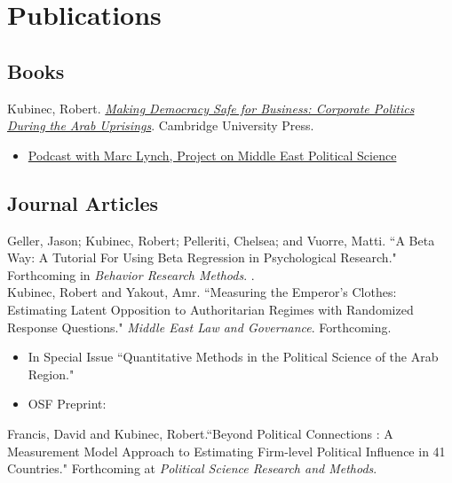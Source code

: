 \documentclass[11pt, a4paper]{article}
\newcommand{\years}[1]{\marginnote{\scriptsize #1}}
\begin{document}
\section*{Publications}

\subsection*{Books}

\years{2023} Kubinec, Robert. \emph{\href{https://www.cambridge.org/gb/academic/subjects/politics-international-relations/political-economy/making-democracy-safe-business-corporate-politics-during-arab-uprisings?format=HB}{Making Democracy Safe for Business: Corporate Politics During the Arab Uprisings}}. Cambridge University Press.\\

\begin{itemize}
	\item \href{https://pomeps.org/making-democracy-safe-for-business-apsa-virtual-posters-s-13-ep-1}{Podcast with Marc Lynch, Project on Middle East Political Science}
\end{itemize}
 
\subsection*{Journal Articles}

\years{2026} Geller, Jason; Kubinec, Robert; Pelleriti, Chelsea; and Vuorre, Matti. ``A Beta Way: A Tutorial For Using Beta Regression in Psychological Research." Forthcoming in \emph{Behavior Research Methods}. .\\

\years{2026} Kubinec, Robert and Yakout, Amr. ``Measuring the Emperor's Clothes: Estimating Latent Opposition to Authoritarian Regimes with Randomized Response Questions." \emph{Middle East Law and Governance}. Forthcoming. 

\begin{itemize}
	\item In Special Issue ``Quantitative Methods in the Political Science of the Arab Region."
	\item OSF Preprint: 
\end{itemize}

\years{2025}  Francis, David and Kubinec, Robert.``Beyond Political Connections : A Measurement Model Approach to Estimating Firm-level Political Influence in 41 Countries." Forthcoming at \emph{Political Science Research and Methods}. \\
\end{document}
